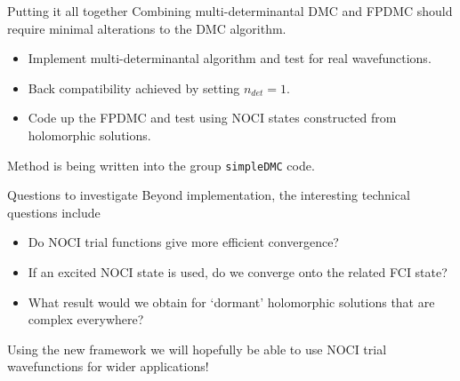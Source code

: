 \documentclass{beamer}
\begin{document}
\begin{frame}{Putting it all together}
  Combining multi-determinantal DMC and FPDMC should require minimal alterations to the DMC algorithm.\\
  \begin{itemize}
    \item Implement multi-determinantal algorithm and test for real wavefunctions.
    \item Back compatibility achieved by setting $n_{det} = 1$.
    \item Code up the FPDMC and test using NOCI states constructed from holomorphic solutions.
  \end{itemize}
  Method is being written into the group \texttt{simpleDMC} code.
\end{frame}

\begin{frame}{Questions to investigate}
  Beyond implementation, the interesting technical questions include
  \begin{itemize}
    \item Do NOCI trial functions give more efficient convergence?
    \item If an excited NOCI state is used, do we converge onto the related FCI state?
    \item What result would we obtain for `dormant' holomorphic solutions that are complex everywhere?
  \end{itemize}
  Using the new framework we will hopefully be able to use NOCI trial wavefunctions for wider applications!
\end{frame}



\end{document}
